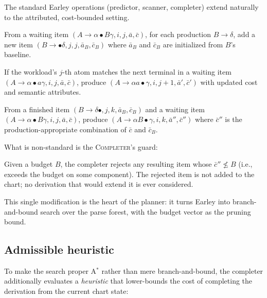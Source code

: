The standard Earley operations (predictor, scanner,
completer) extend naturally to the attributed,
cost-bounded setting.

\begin{description}[nosep,leftmargin=0.8cm]
  \item[\textsc{Predictor}] From a waiting item
    $(A \to \alpha \bullet B \gamma, i, j, \bar{a},
    \bar{c})$, for each production $B \to \delta$,
    add a new item $(B \to \bullet \delta, j, j,
    \bar{a}_B, \bar{c}_B)$ where $\bar{a}_B$ and
    $\bar{c}_B$ are initialized from $B$'s baseline.
  \item[\textsc{Scanner}] If the workload's $j$-th
    atom matches the next terminal in a waiting item
    $(A \to \alpha \bullet a \gamma, i, j, \bar{a},
    \bar{c})$, produce $(A \to \alpha a \bullet
    \gamma, i, j+1, \bar{a}', \bar{c}')$ with
    updated cost and semantic attributes.
  \item[\textsc{Completer}] From a finished item
    $(B \to \delta \bullet, j, k, \bar{a}_B,
    \bar{c}_B)$ and a waiting item $(A \to \alpha
    \bullet B \gamma, i, j, \bar{a}, \bar{c})$,
    produce $(A \to \alpha B \bullet \gamma, i, k,
    \bar{a}'', \bar{c}'')$ where $\bar{c}''$ is the
    production-appropriate combination of $\bar{c}$
    and $\bar{c}_B$.
\end{description}

What is non-standard is the \textsc{Completer}'s
guard:

\begin{definition}
  \label{def:cost-bounded}
  Given a budget $B$, the completer rejects any
  resulting item whose $\bar{c}'' \not\leq B$ (i.e.,
  exceeds the budget on some component). The
  rejected item is not added to the chart; no
  derivation that would extend it is ever
  considered.
\end{definition}

This single modification is the heart of the
planner: it turns Earley into branch-and-bound
search over the parse forest, with the budget
vector as the pruning bound.

\subsection{Admissible heuristic}

To make the search proper A$^*$ rather than mere
branch-and-bound, the completer additionally
evaluates a \emph{heuristic} that lower-bounds the
cost of completing the derivation from the current
chart state:


